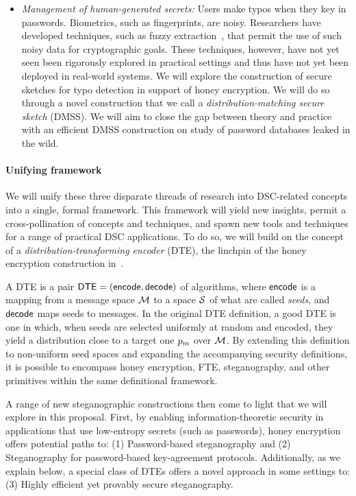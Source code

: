 \documentclass[10pt]{article}
\begin{document}
\begin{itemize}
\item{\em Management of human-generated secrets:} Users make typos when they key in passwords. Biometrics, such as fingerprints, are noisy. Researchers have developed techniques, such as fuzzy extraction~\cite{}, that permit the use of such noisy data for cryptographic goals. These techniques, however, have not yet seen been rigorously explored in practical settings and thus have not yet been deployed in real-world systems. We will explore the construction of secure sketches for typo detection in support of honey encryption. We will do so through a novel construction that we call a {\em distribution-matching secure sketch} (DMSS). We will aim to close the gap between theory and practice with an efficient DMSS construction on study of password databases leaked in the wild.
\end{itemize}



\paragraph{Unifying framework}  We will unify these three disparate threads of research into DSC-related concepts into a single, formal framework. This framework will yield new insights, permit a cross-pollination of concepts and techniques, and spawn new tools and techniques for a range of practical DSC applications. To do so, we will build on the concept of a {\em distribution-transforming encoder} (DTE), the linchpin of the honey encryption construction in~\cite{}. 

A DTE is a 
pair ${\textsf{DTE}} = ({\textsf{encode}},{\textsf{decode}})$ of algorithms, where ${\textsf{encode}}$ is a mapping from a message space ${\cal{M}}$ to a space ${\cal{S}}$ of what are called {\em seeds}, and ${\textsf{decode}}$ maps seeds to messages. In the original DTE definition, a good DTE is one in which, when seeds are selected uniformly at random and encoded, they yield a distribution close to a target one $p_m$ over ${\cal{M}}$. By extending this definition to non-uniform seed spaces and expanding the accompanying security definitions, it is possible to encompass honey encryption, FTE, steganography, and other primitives within the same definitional framework. 

A range of new steganographic constructions then come to light that we will explore in this proposal. First, by enabling information-theoretic security in applications that use low-entropy secrets (such as passwords), honey encryption offers potential paths to: (1) Password-based steganography and (2) Steganography for password-based key-agreement protocols. Additionally, as we explain below, a special class of DTEs offers a novel approach in some settings to: (3) Highly efficient yet provably secure steganography.
\end{document}
